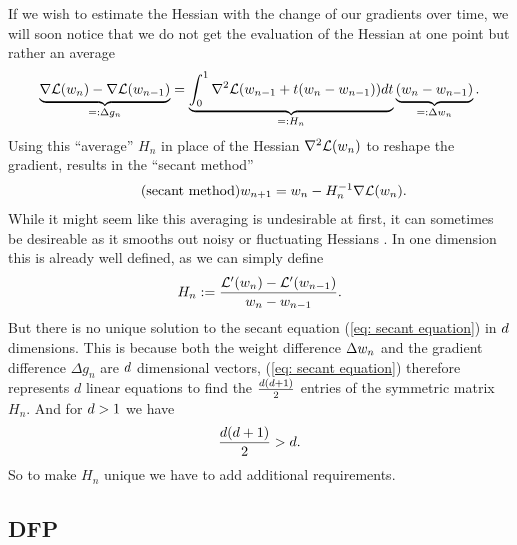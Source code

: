 If we wish to estimate the Hessian with the change of our gradients over time,
we will soon notice that we do not get the evaluation of the Hessian at one point
but rather an average
\begin{align}\label{eq: secant equation}
	\underbrace{\nabla\mathcal{L}(w_n) - \nabla\mathcal{L}(w_{n-1})}_{=:\Delta g_n}
	= \underbrace{\int_0^1 \nabla^2\mathcal{L}(w_{n-1} + t(w_n-w_{n-1}))dt}_{=:H_n}
	\underbrace{(w_n - w_{n-1})}_{=:\Delta w_n}.
\end{align}
Using this ``average'' \(H_n\) in place of the Hessian \(\nabla^2\mathcal{L}(w_n)\)
to reshape the gradient, results in the ``secant method''
\begin{align*}
	\tag{secant method}
	w_{n+1}	= w_n - H_n^{-1}\nabla\mathcal{L}(w_n).
\end{align*}
While it might seem like this averaging is undesirable at first, it
can sometimes be desireable as it smooths out noisy or fluctuating Hessians
\parencite[e.g.][]{metzGradientsAreNot2021}. In one dimension this is already well
defined, as we can simply define
\begin{align*}
	H_n := \frac{\mathcal{L}'(w_n)-\mathcal{L}'(w_{n-1})}{w_n-w_{n-1}}.
\end{align*}
But there is no unique solution to the secant equation (\ref{eq: secant equation})
in \(d\) dimensions. This is because both the weight difference
\(\Delta w_n\) and the gradient difference \(\Delta g_n\) are
\(d\) dimensional vectors, (\ref{eq: secant
equation}) therefore represents \(d\) linear equations to find the
\(\frac{d(d+1)}{2}\) entries of the symmetric matrix \(H_n\).
And for \(d>1\) we have
\begin{align*}
	\frac{d(d+1)}{2} > d.
\end{align*}
So to make \(H_n\) unique we have to add additional requirements. 

\subsection{DFP}

